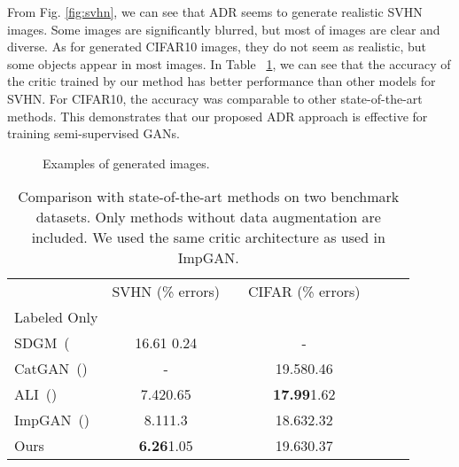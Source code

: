 \documentclass{article} \usepackage{iclr2018_conference,times}
\begin{document}
 From Fig. \ref{fig:svhn}, we can see that ADR seems to generate realistic SVHN images. Some images are significantly blurred, but most of images are clear and diverse.  As for generated CIFAR10 images, they do not seem as realistic, but some objects appear in most images.
In Table~ \ref{table:exp_gan}, we can see that the accuracy of the critic trained by our method has better performance than other models for SVHN. For CIFAR10, the accuracy was comparable to other state-of-the-art methods. This demonstrates that our proposed ADR approach is effective for training semi-supervised GANs. 
\begin{figure}[t]
\begin{minipage}{0.49\hsize}
  \centering
\end{minipage}
\begin{minipage}{0.49\hsize}
  \centering
\end{minipage}
\vspace{-2mm}
\caption{Examples of generated images. }
\label{fig:gan_image}
\end{figure}

\begin{table}[t]
\begin{center}
  \begin{tabular}{lcccccc}
\toprule
& SVHN (\% errors) &&CIFAR (\% errors)\\
Labeled Only &&&&\\\hline
SDGM~(\cite{maaloe2016auxiliary}&16.61  0.24&&-&&\\
CatGAN~(\cite{springenberg2015unsupervised})&- & &19.580.46&&\\
ALI~(\cite{dumoulin2016adversarially})&7.420.65&&{\bf 17.99}1.62\\
  ImpGAN~(\cite{salimans2016improved})&8.111.3 & &18.632.32&&\\\hline

 Ours  &{\bf 6.26}1.05&&19.630.37\\
 \hline
  \end{tabular}
    \caption{Comparison with state-of-the-art methods on two benchmark datasets. Only methods without data augmentation are included. We used the same critic architecture as used in ImpGAN.}
\label{table:exp_gan}
\end{center}
\end{table}
\end{document}
